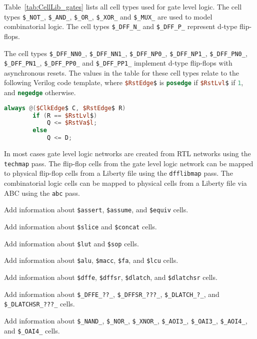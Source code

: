 Table~\ref{tab:CellLib_gates} lists all cell types used for gate level logic. The cell types
{\tt \$\_NOT\_}, {\tt \$\_AND\_}, {\tt \$\_OR\_}, {\tt \$\_XOR\_} and {\tt \$\_MUX\_}
are used to model combinatorial logic. The cell types {\tt \$\_DFF\_N\_} and {\tt \$\_DFF\_P\_}
represent d-type flip-flops.

The cell types {\tt \$\_DFF\_NN0\_}, {\tt \$\_DFF\_NN1\_}, {\tt \$\_DFF\_NP0\_}, {\tt \$\_DFF\_NP1\_},
{\tt \$\_DFF\_PN0\_}, {\tt \$\_DFF\_PN1\_}, {\tt \$\_DFF\_PP0\_} and {\tt \$\_DFF\_PP1\_} implement
d-type flip-flops with asynchronous resets. The values in the table for these cell types relate to the
following Verilog code template, where \lstinline[mathescape,language=Verilog];$RstEdge$; is \lstinline[language=Verilog];posedge;
if \lstinline[mathescape,language=Verilog];$RstLvl$; if \lstinline[language=Verilog];1;, and \lstinline[language=Verilog];negedge;
otherwise.

\begin{lstlisting}[mathescape,language=Verilog]
	always @($ClkEdge$ C, $RstEdge$ R)
		if (R == $RstLvl$)
			Q <= $RstVa$l;
		else
			Q <= D;
\end{lstlisting}

In most cases gate level logic networks are created from RTL networks using the {\tt techmap} pass. The flip-flop cells
from the gate level logic network can be mapped to physical flip-flop cells from a Liberty file using the {\tt dfflibmap}
pass. The combinatorial logic cells can be mapped to physical cells from a Liberty file via ABC 
using the {\tt abc} pass.

\begin{fixme}
Add information about {\tt \$assert}, {\tt \$assume}, and {\tt \$equiv} cells.
\end{fixme}

\begin{fixme}
Add information about {\tt \$slice} and {\tt \$concat} cells.
\end{fixme}

\begin{fixme}
Add information about {\tt \$lut} and {\tt \$sop} cells.
\end{fixme}

\begin{fixme}
Add information about {\tt \$alu}, {\tt \$macc}, {\tt \$fa}, and {\tt \$lcu} cells.
\end{fixme}

\begin{fixme}
Add information about {\tt \$dffe}, {\tt \$dffsr}, {\tt \$dlatch}, and {\tt \$dlatchsr} cells.
\end{fixme}

\begin{fixme}
Add information about {\tt \$\_DFFE\_??\_}, {\tt \$\_DFFSR\_???\_}, {\tt \$\_DLATCH\_?\_}, and {\tt \$\_DLATCHSR\_???\_} cells.
\end{fixme}

\begin{fixme}
Add information about {\tt \$\_NAND\_}, {\tt \$\_NOR\_}, {\tt \$\_XNOR\_}, {\tt \$\_AOI3\_}, {\tt \$\_OAI3\_}, {\tt \$\_AOI4\_}, and {\tt \$\_OAI4\_} cells.
\end{fixme}

